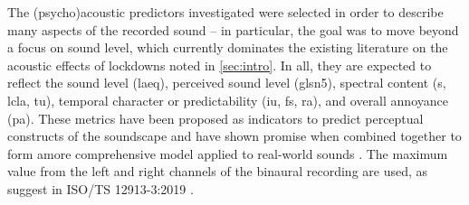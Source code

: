    The (psycho)acoustic predictors investigated were selected in order to describe many aspects of the recorded sound -- in particular, the goal was to move beyond a focus on sound level, which currently dominates the existing literature on the acoustic effects of lockdowns noted in \ref{sec:intro}. In all, they are expected to reflect the sound level (\gls{laeq}), perceived sound level (gls{n5}), spectral content (\gls{s}, \gls{lcla}, \gls{tu}), temporal character or predictability (\gls{iu}, \gls{fs}, \gls{ra}), and overall annoyance (\gls{pa}). These metrics have been proposed as indicators to predict perceptual constructs of the soundscape \citep{Aletta2017Dimensions, Aletta2016Soundscape} and have shown promise when combined together to form amore comprehensive model applied to real-world sounds \citep{Orga2021Multilevel}. The maximum value from the left and right channels of the binaural recording are used, as suggest in ISO/TS 12913-3:2019 \citep{ISO12913Part3}.

